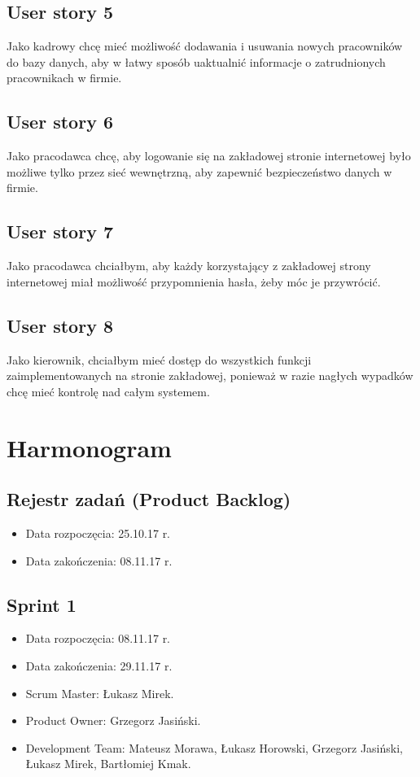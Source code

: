 \documentclass[a4paper]{article}
\begin{document}
\subsection{User story 5}
Jako kadrowy chcę mieć możliwość dodawania i usuwania nowych pracowników do bazy danych, aby w łatwy sposób uaktualnić informacje o zatrudnionych pracownikach w firmie. 

\subsection{User story 6}
Jako pracodawca chcę, aby logowanie się na zakładowej stronie internetowej było możliwe tylko przez sieć wewnętrzną, aby zapewnić bezpieczeństwo danych w firmie.

\subsection{User story 7}
Jako pracodawca chciałbym, aby każdy korzystający z zakładowej strony internetowej miał możliwość przypomnienia hasła, żeby móc je przywrócić.

\subsection{User story 8}
Jako kierownik, chciałbym mieć dostęp do wszystkich funkcji zaimplementowanych na stronie zakładowej, ponieważ w razie nagłych wypadków chcę mieć kontrolę nad całym systemem.


\section{Harmonogram}

\subsection{Rejestr zadań (Product Backlog)}

\begin{itemize}
\item Data rozpoczęcia: 25.10.17 r.
\item Data zakończenia: 08.11.17 r.
\end{itemize}

\subsection{Sprint 1}

\begin{itemize}
\item Data rozpoczęcia: 08.11.17 r.
\item Data zakończenia: 29.11.17 r.
\item Scrum Master: Łukasz Mirek.
\item Product Owner: Grzegorz Jasiński.
\item Development Team: Mateusz Morawa, Łukasz Horowski, Grzegorz Jasiński, Łukasz Mirek, Bartłomiej Kmak.
\end{itemize}
\end{document}
